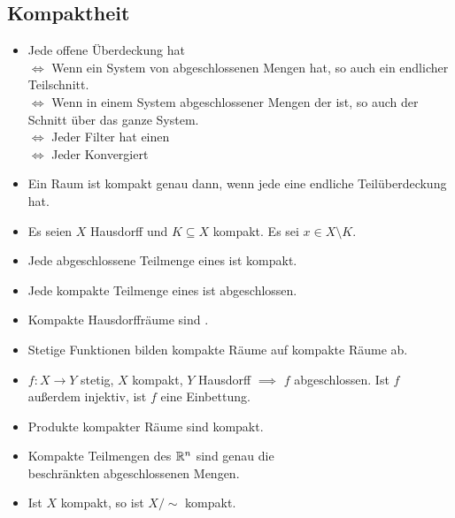 \documentclass[8pt]{extarticle}
\begin{document}
\subsection*{Kompaktheit}
\begin{itemize}
	\item Jede offene Überdeckung hat \\ $\Leftrightarrow$ Wenn ein System von abgeschlossenen Mengen  hat, so auch ein endlicher Teilschnitt.\\ $\Leftrightarrow$ Wenn in einem System abgeschlossener Mengen der  ist, so auch der Schnitt über das ganze System.\\ 
	$\Leftrightarrow$ Jeder Filter hat einen \\ $\Leftrightarrow$ Jeder  Konvergiert
	\item Ein Raum ist kompakt genau dann, wenn jede  eine endliche Teilüberdeckung hat.
	\item Es seien $X$ Hausdorff und $K \subseteq X$ kompakt. Es sei $x \in X \setminus K$. 
	\item Jede abgeschlossene Teilmenge eines  ist kompakt.
	\item Jede kompakte Teilmenge eines  ist abgeschlossen.
	\item Kompakte Hausdorffräume sind .
	\item Stetige Funktionen bilden kompakte Räume auf kompakte Räume ab.
	\item $f : X \to Y$ stetig, $X$ kompakt, $Y$ Hausdorff $\implies$ $f$ abgeschlossen. Ist $f$ außerdem injektiv, ist $f$ eine Einbettung.
	\item {} Produkte kompakter Räume sind kompakt.
	\item {} Kompakte Teilmengen des $\mathbb{R}^n$ sind genau die\\ beschränkten abgeschlossenen Mengen.
	\item Ist $X$ kompakt, so ist $X/\sim$ kompakt.
\end{itemize}
\clearpage
\end{document}
